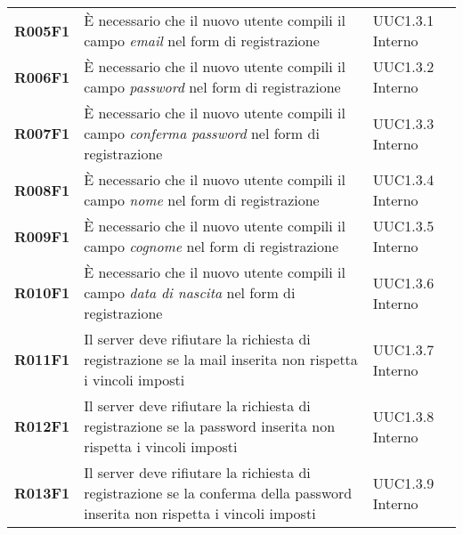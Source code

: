 \documentclass[../analisi-dei-requisiti.tex]{subfiles}
\begin{document}
\begin{longtable}[H]{>{\centering\bfseries}m{3cm} >{\centering}m{10cm} >{\centering\arraybackslash}m{3cm}}
  R005F1                               & È necessario che il nuovo utente compili il campo \textit{email} nel form di registrazione                                                                                                              & UUC1.3.1 Interno              \\
  R006F1                               & È necessario che il nuovo utente compili il campo \textit{password} nel form di registrazione                                                                                                           & UUC1.3.2 Interno              \\
  R007F1                               & È necessario che il nuovo utente compili il campo \textit{conferma password} nel form di registrazione                                                                                                  & UUC1.3.3 Interno              \\
  R008F1                               & È necessario che il nuovo utente compili il campo \textit{nome} nel form di registrazione                                                                                                               & UUC1.3.4 Interno              \\
  R009F1                               & È necessario che il nuovo utente compili il campo \textit{cognome} nel form di registrazione                                                                                                            & UUC1.3.5 Interno              \\
  R010F1                               & È necessario che il nuovo utente compili il campo \textit{data di nascita} nel form di registrazione                                                                                                    & UUC1.3.6 Interno              \\
  R011F1                               & Il server deve rifiutare la richiesta di registrazione se la mail inserita non rispetta i vincoli imposti                                                                                               & UUC1.3.7 Interno              \\
  R012F1                               & Il server deve rifiutare la richiesta di registrazione se la password inserita non rispetta i vincoli imposti                                                                                           & UUC1.3.8 Interno              \\
  R013F1                               & Il server deve rifiutare la richiesta di registrazione se la conferma della password inserita non rispetta i vincoli imposti                                                                            & UUC1.3.9 Interno              \\

\end{longtable}
\end{document}
